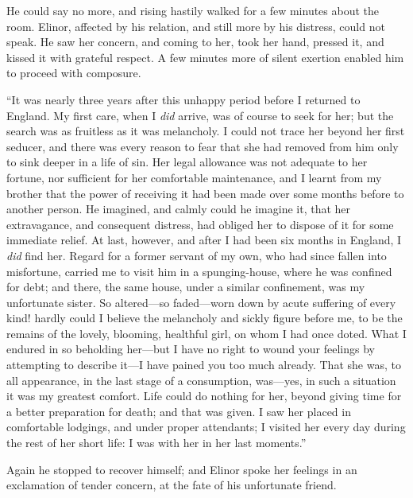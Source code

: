\documentclass{article}
\begin{document}
He could say no more, and rising hastily walked for a few
minutes about the room.  Elinor, affected by his relation,
and still more by his distress, could not speak.  He saw
her concern, and coming to her, took her hand, pressed it,
and kissed it with grateful respect.  A few minutes more
of silent exertion enabled him to proceed with composure.

``It was nearly three years after this unhappy
period before I returned to England.  My first care,
when I \emph{did} arrive, was of course to seek for her;
but the search was as fruitless as it was melancholy.
I could not trace her beyond her first seducer, and there
was every reason to fear that she had removed from him
only to sink deeper in a life of sin.  Her legal allowance
was not adequate to her fortune, nor sufficient for her
comfortable maintenance, and I learnt from my brother that
the power of receiving it had been made over some months
before to another person.  He imagined, and calmly could he
imagine it, that her extravagance, and consequent distress,
had obliged her to dispose of it for some immediate relief.
At last, however, and after I had been six months in England,
I \emph{did} find her.  Regard for a former servant of my own,
who had since fallen into misfortune, carried me to visit
him in a spunging-house, where he was confined for debt;
and there, the same house, under a similar confinement,
was my unfortunate sister.  So altered---so faded---worn
down by acute suffering of every kind! hardly could I
believe the melancholy and sickly figure before me,
to be the remains of the lovely, blooming, healthful girl,
on whom I had once doted.  What I endured in so beholding
her---but I have no right to wound your feelings by attempting
to describe it---I have pained you too much already.
That she was, to all appearance, in the last stage
of a consumption, was---yes, in such a situation it was
my greatest comfort.  Life could do nothing for her,
beyond giving time for a better preparation for death;
and that was given.  I saw her placed in comfortable lodgings,
and under proper attendants; I visited her every day
during the rest of her short life: I was with her in her
last moments.''

Again he stopped to recover himself; and Elinor
spoke her feelings in an exclamation of tender concern,
at the fate of his unfortunate friend.
\end{document}
